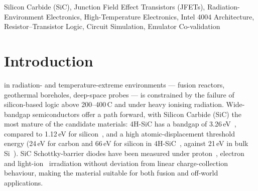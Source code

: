 %

\begin{abstract}
Silicon Carbide (SiC) Junction Field Effect Transistors (JFETs) are a leading candidate for digital logic operating in radiation environments and at temperatures beyond the reach of bulk silicon. To the authors' knowledge, this work presents the first transistor-level SiC JFET implementation of an Intel-4004-compatible 4-bit microprocessor architecture, comprising \TotalJFETCount{} transistors across the ALU, instruction decoder, program counter, three-level stack, and sixteen-register scratch pad, with a compatible 4001-style ROM model used for program execution. The contributions are three. First, a complete 4004-compatible transistor-level SiC JFET RTL design captured at the schematic level in LTspice. Second, a program-level co-validation methodology in which a custom Python reference emulator matches the LTspice CPU register-for-register at every instruction boundary, demonstrated on a bitwise AND subroutine from the MCS-4 programming manual and a 16-bit floating-point multiplication. Third, measured NAND/NOR primitive switching behaviour consistent in timing and waveform shape with LTspice simulation, characterised from 1\,Hz up to 800\,kHz (NOR) and 1\,MHz (NAND), with an unresolved 1.5--2\,V baseline offset and other limitations of the present validation chain treated explicitly.
\end{abstract}
\begin{IEEEkeywords}
Silicon Carbide (SiC), Junction Field Effect Transistors (JFETs), Radiation-Environment Electronics, High-Temperature Electronics, Intel 4004 Architecture, Resistor--Transistor Logic, Circuit Simulation, Emulator Co-validation
\end{IEEEkeywords}

\section{Introduction}\label{intro}
 in radiation- and temperature-extreme environments --- fusion reactors, geothermal boreholes, deep-space probes --- is constrained by the failure of silicon-based logic above 200--400\,\degree C and under heavy ionising radiation. Wide-bandgap semiconductors offer a path forward, with Silicon Carbide (SiC) the most mature of the candidate materials: 4H-SiC has a bandgap of 3.26\,eV~\cite{SiCBandGap}, compared to 1.12\,eV for silicon~\cite{SiBandGap}, and a high atomic-displacement threshold energy (24\,eV for carbon and 66\,eV for silicon in 4H-SiC~\cite{RadHard}, against 21\,eV in bulk Si~\cite{SIHard}). SiC Schottky-barrier diodes have been measured under proton~\cite{Nava2003645}, electron~\cite{Iwamoto2013} and light-ion~\cite{LEE2003489} irradiation without deviation from linear charge-collection behaviour, making the material suitable for both fusion and off-world applications.

